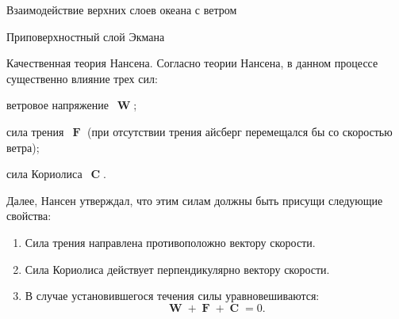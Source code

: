 \begin{chapter}{Взаимодействие верхних слоев океана с ветром}
\begin{section}{Приповерхностный слой Экмана}
\begin{paragraph}{Качественная теория Нансена.}
Согласно теории Нансена, в данном процессе существенно влияние трех сил:
\begin{enumparen}
\item ветровое напряжение~$\mbfW$;
%

\item 
сила трения~$\mbfF$ (при отсутствии трения айсберг перемещался бы со скоростью
ветра);
%

\item 
сила Кориолиса~$\mbfC$.
%
\end{enumparen}
Далее, Нансен утверждал, что этим силам должны быть присущи следующие 
свойства:
%
\begin{enumerate}
\item 
Сила трения направлена противоположно вектору скорости.
%

\item 
Сила Кориолиса действует перпендикулярно вектору скорости.
%

\item 
В случае установившегося течения силы уравновешиваются:  
\begin{displaymath}
 \mbfW + \mbfF + \mbfC = 0.
\end{displaymath}
%
\end{enumerate}
\end{paragraph}


\end{section}
\end{chapter}
